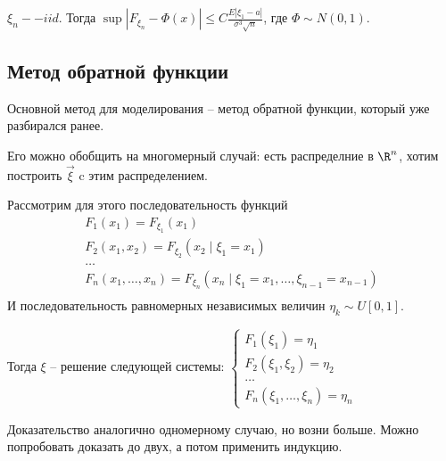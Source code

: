 \begin{theorem}
$\xi_n -- iid$. Тогда $\sup |F_{\xi_n} - \Phi(x)| \leq C \frac{E |\xi_1 - a|}{\sigma^3 \sqrt{n}}$, где $\Phi \sim N(0, 1)$.
\end{theorem}

\subsection{Метод обратной функции}
\begin{exmp}
Основной метод для моделирования -- метод обратной функции, который уже разбирался ранее.

Его можно обобщить на многомерный случай: есть распределние в $\R^n$, хотим построить $\overrightarrow{\xi}$ c этим распределением.

Рассмотрим для этого последовательность функций 
\begin{gather*}
F_1(x_1) = F_{\xi_1}(x_1) \\
F_2(x_1, x_2) = F_{\xi_2} (x_2 \mid \xi_1 = x_1) \\
\dots \\
F_n(x_1, \dots, x_n) = F_{\xi_n} (x_n \mid \xi_1 = x_1, \dots, \xi_{n-1} = x_{n-1}) \\
\end{gather*}     
И последовательность равномерных независимых величин $\eta_k \sim U[0, 1]$.

Тогда $\xi$ -- решение следующей системы:
$\begin{cases}
F_1(\xi_1) = \eta_1 \\
F_2(\xi_1, \xi_2) = \eta_2 \\ 
\dots \\
F_n(\xi_1, \dots, \xi_n) = \eta_n
\end{cases}$

Доказательство аналогично одномерному случаю, но возни больше. Можно попробовать доказать до двух, а потом применить индукцию.
\end{exmp}

